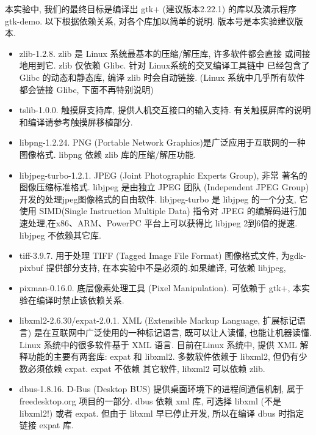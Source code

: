 本实验中, 我们的最终目标是编译出 gtk+ (建议版本2.22.1) 的库以及演示程序
gtk-demo. 以下根据依赖关系, 对各个库加以简单的说明. 版本号是本实验建议版本.
\begin{itemize}
    \item zlib-1.2.8. zlib 是 Linux 系统最基本的压缩/解压库, 许多软件都会直接
        或间接地用到它. zlib 仅依赖 Glibc. 针对 Linux系统的交叉编译工具链中
        已经包含了 Glibc 的动态和静态库, 编译 zlib 时会自动链接.
        (Linux 系统中几乎所有软件都会链接 Glibc, 下面不再特别说明)

    \item tslib-1.0.0. 触摸屏支持库, 提供人机交互接口的输入支持.
        有关触摸屏库的说明和编译请参考触摸屏移植部分.

    \item libpng-1.2.24. PNG (Portable Network Graphics)是广泛应用于互联网的一种
        图像格式. libpng 依赖 zlib 库的压缩/解压功能.

    \item libjpeg-turbo-1.2.1. JPEG (Joint Photographic Experts Group), 非常
        著名的图像压缩标准格式. libjpeg 是由独立 JPEG 团队 (Independent
        JPEG Group) 开发的处理jpeg图像格式的自由软件. libjpeg-turbo 是
        libjpeg 的一个分支, 它使用 SIMD(Single Instruction Multiple Data)
        指令对 JPEG 的编解码进行加速处理,在x86、ARM、PowerPC
        平台上可以获得比 libjpeg 2到6倍的提速. libjpeg 不依赖其它库.
    \item tiff-3.9.7. 用于处理 TIFF (Tagged Image File Format) 图像格式文件,
        为gdk-pixbuf 提供部分支持, 在本实验中不是必须的.如果编译,
        可依赖 libjpeg,

    \item pixman-0.16.0. 底层像素处理工具 (Pixel Manipulation). 可依赖于
        gtk+, 本实验在编译时禁止该依赖关系.

    \item libxml2-2.6.30/expat-2.0.1. XML (Extensible Markup Language,
        扩展标记语言) 是在互联网中广泛使用的一种标记语言, 既可以让人读懂,
        也能让机器读懂. Linux 系统中的很多软件基于 XML 语言. 目前在Linux
        系统中, 提供 XML 解释功能的主要有两套库: expat 和 libxml2.
        多数软件依赖于 libxml2, 但仍有少数必须依赖 expat. expat 不依赖
        其它软件, libxml2 可以依赖 zlib.

    \item dbus-1.8.16. D-Bus (Desktop BUS) 提供桌面环境下的进程间通信机制,
        属于 freedesktop.org 项目的一部分. dbus 依赖 xml 库, 可选择 libxml
        (不是 libxml2!) 或者 expat. 但由于 libxml 早已停止开发, 所以在编译
        dbus 时指定链接 expat 库.


\end{itemize}
